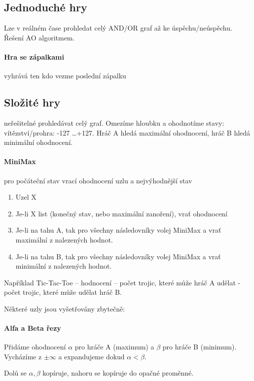 \documentclass[a4paper, 11pt]{report}
\begin{document}
\subsection{Jednoduché hry}

Lze v reálném čase prohledat celý AND/OR graf až ke úspěchu/neúspěchu. Řešení AO algoritmem.

\paragraph{Hra se zápalkami}

vyhrává ten kdo vezme poslední zápalku

\subsection{Složité hry}

neřešitelné prohledávat celý graf. Omezíme hloubku a ohodnotíme stavy: vítězství/prohra: -127 \dots +127. Hráč A hledá maximální ohodnocení, hráč B hledá minimální ohodnocení.

\paragraph{MiniMax} pro počáteční stav vrací ohodnocení uzlu a nejvýhodnější stav
\begin{enumerate}
	\item Uzel X
	\item Je-li X list (konečný stav, nebo maximální zanoření), vrať ohodnocení
	\item Je-li na tahu A, tak pro všechny následovníky volej MiniMax a vrať maximální z nalezených hodnot.
	\item Je-li na tahu B, tak pro všechny následovníky volej MiniMax a vrať minimální z nalezených hodnot.
\end{enumerate}

Například Tic-Tac-Toe -- hodnocení -- počet trojic, které může hráč A udělat - počet trojic, které může udělat hráč B.

Některé uzly jsou vyšetřovány zbytečně:

\paragraph{Alfa a Beta řezy}
Přidáme ohodnocení $\alpha$ pro hráče A (maximum) a $\beta$ pro hráče B (minimum). Vycházíme z $\pm \infty$ a expandujeme dokud $ \alpha < \beta$.

Dolů se $\alpha, \beta$ kopíruje, nahoru se kopíruje do opačné proměnné.
\end{document}
